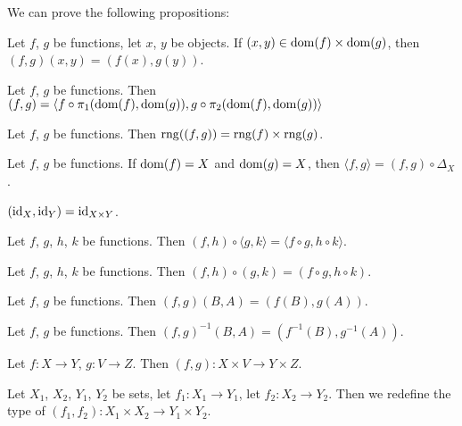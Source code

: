 \documentclass{article}
\begin{document}
We can prove the following propositions:
\begin{thm}
\item\label{funct3:65} Let $f$, $g$ be functions, let $x$, $y$ be objects.
  If $(x,y)\in\operatorname{dom}(f)\times\operatorname{dom}(g)$, then $(f,g)(x,y)=(f(x),g(y))$.
\item\label{funct3:66} Let $f$, $g$ be functions.
  Then $(f,g)=\langle f\circ\pi_{1}(\operatorname{dom}(f), \operatorname{dom}(g)),g\circ\pi_{2}(\operatorname{dom}(f), \operatorname{dom}(g))\rangle$
\item\label{funct3:67} Let $f$, $g$ be functions.
  Then $\operatorname{rng}((f,g))=\operatorname{rng}(f)\times\operatorname{rng}(g)$.
\item\label{funct3:68} Let $f$, $g$ be functions.
  If $\operatorname{dom}(f)=X$ and $\operatorname{dom}(g)=X$, then $\langle f,g\rangle=(f,g)\circ\Delta_{X}$.
\item\label{funct3:69} $(\operatorname{id}_{X},\operatorname{id}_{Y})=\operatorname{id}_{X\times Y}$.
\item\label{funct3:70} Let $f$, $g$, $h$, $k$ be functions.
  Then $(f,h)\circ\langle g,k\rangle=\langle f\circ g,h\circ k\rangle$.
\item\label{funct3:71} Let $f$, $g$, $h$, $k$ be functions.
  Then $(f,h)\circ(g,k)=(f\circ g,h\circ k)$.
\item\label{funct3:72} Let $f$, $g$ be functions.
  Then $(f,g)(B,A)=(f(B),g(A))$.
\item\label{funct3:73} Let $f$, $g$ be functions.
  Then $(f,g)^{-1}(B,A)=(f^{-1}(B),g^{-1}(A))$.
\item\label{funct3:74} Let $f\colon X\to Y$, $g\colon V\to Z$.
  Then $(f,g)\colon X\times V\to Y\times Z$.
\end{thm}

\begin{definition}
Let $X_{1}$, $X_{2}$, $Y_{1}$, $Y_{2}$ be sets, let $f_{1}\colon X_{1}\to Y_{1}$,
let $f_{2}\colon X_{2}\to Y_{2}$.
Then we redefine the type of $(f_{1},f_{2})\colon X_{1}\times X_{2}\to Y_{1}\times Y_{2}$.
\end{definition}
\end{document}
